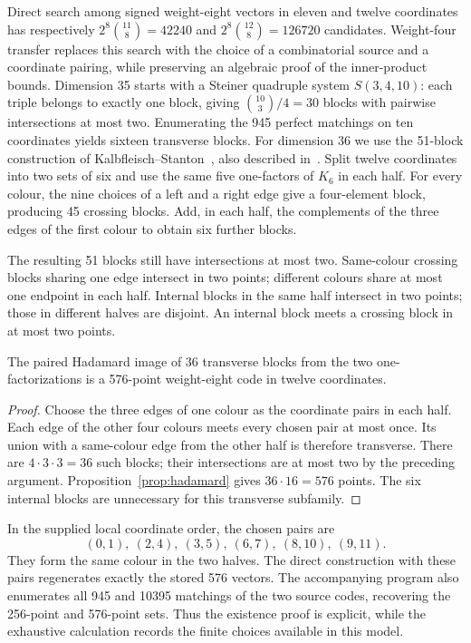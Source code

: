 Direct search among signed weight-eight vectors in eleven and twelve
coordinates has respectively $2^8\binom{11}{8}=42240$ and
$2^8\binom{12}{8}=126720$ candidates. Weight-four transfer replaces this
search with the choice of a combinatorial source and a coordinate pairing,
while preserving an algebraic proof of the inner-product bounds.
Dimension 35 starts with a Steiner quadruple system $S(3,4,10)$:
each triple belongs to exactly one block, giving $\binom{10}{3}/4=30$
blocks with pairwise intersections at most two. Enumerating the 945
perfect matchings on ten coordinates yields sixteen transverse blocks.
For dimension 36 we use the 51-block construction of
Kalbfleisch--Stanton~\cite[Theorem 7]{kalbfleisch-stanton}, also described
in~\cite[Section V, Construction 1]{signed-johnson}.
Split twelve coordinates into two sets of six and
use the same five one-factors of $K_6$ in each half. For every colour,
the nine choices of a left and a right edge give a four-element block,
producing 45 crossing blocks. Add, in each half, the complements of
the three edges of the first colour to obtain six further blocks.

The resulting 51 blocks still have intersections at most two.
Same-colour crossing blocks sharing one edge intersect in two points;
different colours share at most one endpoint in each half. Internal
blocks in the same half intersect in two points; those in different
halves are disjoint. An internal block meets a crossing block in at most
two points.

\begin{proposition}
\label{prop:local36}
The paired Hadamard image of 36 transverse blocks from the two
one-factorizations is a 576-point weight-eight code in twelve coordinates.
\end{proposition}
\begin{proof}
Choose the three edges of one colour as the coordinate pairs in each
half. Each edge of the other four colours meets every chosen pair at most
once. Its union with a same-colour edge from the other half is therefore
transverse. There are $4\cdot3\cdot3=36$ such blocks; their intersections
are at most two by the preceding argument. Proposition~\ref{prop:hadamard}
gives $36\cdot16=576$ points. The six internal blocks are unnecessary
for this transverse subfamily.
\end{proof}

In the supplied local coordinate order, the chosen pairs are
\[
(0,1),\ (2,4),\ (3,5),\ (6,7),\ (8,10),\ (9,11).
\]
They form the same colour in
the two halves. The direct construction with these pairs regenerates
exactly the stored 576 vectors. The accompanying program also enumerates
all 945 and 10395 matchings of the two source codes, recovering the
256-point and 576-point sets. Thus the existence proof is explicit,
while the exhaustive calculation records the finite choices available
in this model.

